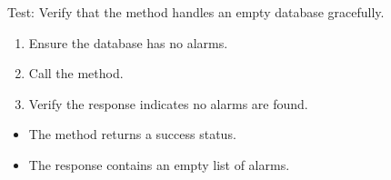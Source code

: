 \documentclass[letterpaper,10pt,english]{sphinxmanual}
\begin{document}
\begin{fulllineitems}
\label{\detokenize{test:test.test_alarm.test_list_alarms_empty_database}}
\pysigstartsignatures
\pysiglinewithargsret
{}
{}
{}
\pysigstopsignatures
\sphinxAtStartPar
Test: Verify that the method handles an empty database gracefully.
\begin{description}
\begin{enumerate}
%
\item {} 
\sphinxAtStartPar
Ensure the database has no alarms.

\item {} 
\sphinxAtStartPar
Call the  method.

\item {} 
\sphinxAtStartPar
Verify the response indicates no alarms are found.

\end{enumerate}

\begin{itemize}
\item {} 
\sphinxAtStartPar
The method returns a success status.

\item {} 
\sphinxAtStartPar
The response contains an empty list of alarms.

\end{itemize}

\end{description}

\end{fulllineitems}

\end{document}
